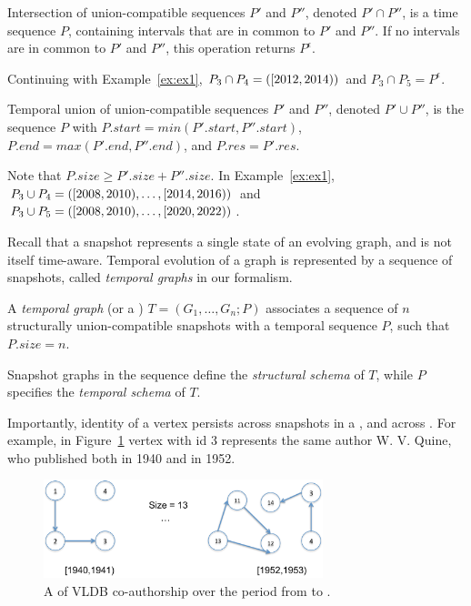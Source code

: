 \begin{definition} 
Intersection of union-compatible sequences $P'$ and $P''$, denoted $P'
\cap P''$, is a time sequence $P$, containing intervals that are in
common to $P'$ and $P''$.  If no intervals are in common to $P'$ and
$P''$, this operation returns $P^{\epsilon}$.
\label{def:tseqand}
\end{definition}

Continuing with Example~\ref{ex:ex1}, $P_3 \cap P_4 =
([2012,2014))$ and $P_3 \cap P_5 = P^{\epsilon}$.

\begin{definition} 
Temporal union of union-compatible sequences $P'$ and $P''$, denoted
$P' \cup P''$, is the sequence $P$ with $P.start = min(P'.start,
P''.start)$, $P.end = max(P'.end, P''.end)$, and $P.res = P'.res$.
\label{def:tseqor}
\end{definition}

Note that $P.size \geq P'.size + P''.size$. In Example~\ref{ex:ex1},
$P_3 \cup P_4 =
([2008,2010),\ldots,[2014,2016))$ and $P_3
    \cup P_5 = ([2008,2010), \ldots,
      [2020,2022))$.

Recall that a snapshot represents a single state of an evolving graph,
and is not itself time-aware.  Temporal evolution of a graph is
represented by a sequence of snapshots, called {\em temporal graphs}
in our formalism.

\begin{definition} [TGraph]
A {\em temporal graph} (or a {\em \tg}) $T = (G_1, \ldots, G_n; P)$
  associates a sequence of $n$ structurally union-compatible snapshots
  with a temporal sequence $P$, such that $P.size = n$.
\label{def:tgraph} 
\end{definition}

Snapshot graphs in the sequence define the {\em structural schema} of
$T$, while $P$ specifies the {\em temporal schema} of $T$.

Importantly, identity of a vertex persists across snapshots in a
\tg, and across \tgs.  For example, in Figure~\ref{fig:tgraph}
vertex with id 3 represents the same author W. V. Quine, who published
both in 1940 and in 1952.

\begin{figure}
\includegraphics[width=3.2in]{figs/temporalgraph.pdf}
\caption{A \tg of VLDB co-authorship over the period from  to .}
\label{fig:tgraph}
\end{figure}

